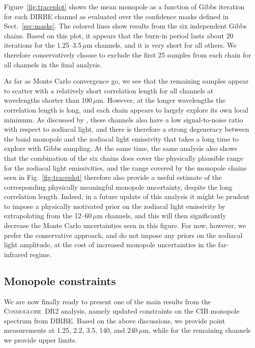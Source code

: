 \documentclass{aa}
\newcommand{\cosmoglobe}{\textsc{Cosmoglobe}}
\begin{document}
Figure~\ref{fig:traceplot} shows the mean monopole as a function of
Gibbs iteration for each DIRBE channel as evaluated over the
confidence masks defined in Sect.~\ref{sec:masks}. The colored lines
show results from the six independent Gibbs chains. Based on this
plot, it appears that the burn-in period lasts about 20\,iterations
for the 1.25--3.5$\,\mu\mathrm{m}$ channels, and it is very short for
all others. We therefore conservatively choose to exclude the first 25
samples from each chain for all channels in the final analysis.

As far as Monte Carlo convergence go, we see that the remaining
samples appear to scatter with a relatively short correlation length
for all channels at wavelengths shorter than
100$\,\mu\mathrm{m}$. However, at the longer wavelengths the
correlation length is long, and each chain appears to largely explore
its own local minimum. As discussed by \citet{CG02_02}, these channels
also have a low signal-to-noise ratio with respect to zodiacal light,
and there is therefore a strong degeneracy between the band monopole
and the zodiacal light emissivity that takes a long time to explore
with Gibbs sampling. At the same time, the same analysis also shows
that the combination of the six chains does cover the physically
plausible range for the zodiacal light emissivities, and the range
covered by the monopole chains seen in Fig.~\ref{fig:traceplot}
therefore also provide a useful estimate of the corresponding
physically meaningful monopole uncertainty, despite the long
correlation length. Indeed, in a future update of this analysis it
might be prudent to impose a physically motivated prior on the
zodiacal light emissivity by extrapolating from the
12--60\,$\mu\mathrm{m}$ channels, and this will then significantly
decrease the Monte Carlo uncertainties seen in this figure. For now,
however, we prefer the conservative approach, and do not impose any
priors on the zodiacal light amplitude, at the cost of increased
monopole uncertainties in the far-infrared regime.

\subsection{Monopole constraints}

We are now finally ready to present one of the main results from the
\cosmoglobe\ DR2 analysis, namely updated constraints on the CIB
monopole spectrum from DIRBE. Based on the above discussions, we
provide point measurements at 1.25, 2.2, 3.5, 140, and
240$\,\mu\mathrm{m}$, while for the remaining channels we provide
upper limits.
\end{document}
